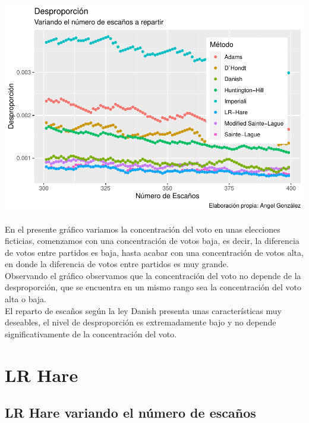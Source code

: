 \documentclass[12pt,a4paper,]{book}
\numberwithin{dummy}{section}
\theoremstyle{ocrenumbox}
\theoremstyle{blacknumex}
\theoremstyle{blacknumbox}
\theoremstyle{ocrenum}
\theoremstyle{ocrenum}
\begin{document}
\begin{center}\includegraphics[width=0.95\linewidth]{figurasR/unnamed-chunk-45-1} \end{center}

En el presente gráfico variamos la concentración del voto en unas
elecciones ficticias, comenzamos con una concentración de votos baja, es
decir, la diferencia de votos entre partidos es baja, hasta acabar con
una concentración de votos alta, en donde la diferencia de votos entre
partidos es muy grande.\\
Observando el gráfico observamos que la concentración del voto no
depende de la desproporción, que se encuentra en un mismo rango sea la
concentración del voto alta o baja.\\
El reparto de escaños según la ley Danish presenta unas características
muy deseables, el nivel de desproporción es extremadamente bajo y no
depende significativamente de la concentración del voto.

\hypertarget{lr-hare}{%
\section{LR Hare}\label{lr-hare}}

\hypertarget{lr-hare-variando-el-nuxfamero-de-escauxf1os}{%
\subsection{LR Hare variando el número de
escaños}\label{lr-hare-variando-el-nuxfamero-de-escauxf1os}}
\end{document}

